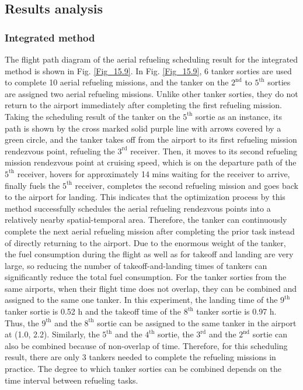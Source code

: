 \subsection{Results analysis}\label{sec_5.3}
\subsubsection{Integrated method}\label{sec_5.3.1}

The flight path diagram of the aerial refueling scheduling result for the integrated method is shown in Fig. \ref{Fig_15.9}. In Fig. \ref{Fig_15.9}, 6 tanker sorties are used to complete 10 aerial refueling missions, and the tanker on the $2^\text{nd}$ to $5^\text{th}$  sorties are assigned two aerial refueling missions. Unlike other tanker sorties, they do not return to the airport immediately after completing the first refueling mission. Taking the scheduling result of the tanker on the $5^\text{th}$  sortie as an instance, its path is shown by the cross marked solid purple line with arrows covered by a green circle, and the tanker takes off from the airport to its first refueling mission rendezvous point, refueling the $3^\text{rd}$  receiver. Then, it moves to its second refueling mission rendezvous point at cruising speed, which is on the departure path of the $5^\text{th}$  receiver, hovers for approximately 14 mins waiting for the receiver to arrive, finally fuels the $5^\text{th}$  receiver, completes the second refueling mission and goes back to the airport for landing. This indicates that the optimization process by this method successfully schedules the aerial refueling rendezvous points into a relatively nearby spatial-temporal area. Therefore, the tanker can continuously complete the next aerial refueling mission after completing the prior task instead of directly returning to the airport. Due to the enormous weight of the tanker, the fuel consumption during the flight as well as for takeoff and landing are very large, so reducing the number of takeoff-and-landing times of tankers can significantly reduce the total fuel consumption. For the tanker sorties from the same airports, when their flight time does not overlap, they can be combined and assigned to the same one tanker. In this experiment, the landing time of the $9^\text{th}$ tanker sortie is 0.52 h and the takeoff time of the $8^\text{th}$  tanker sortie is 0.97 h. Thus, the $9^\text{th}$  and the $8^\text{th}$  sortie can be assigned to the same tanker in the airport at (1.0, 2.2). Similarly, the $5^\text{th}$  and the $4^\text{th}$  sortie, the $3^\text{rd}$ and the $2^\text{nd}$ sortie can also be combined because of non-overlap of time. Therefore, for this scheduling result, there are only 3 tankers needed to complete the refueling missions in practice. The degree to which tanker sorties can be combined depends on the time interval between refueling tasks.

